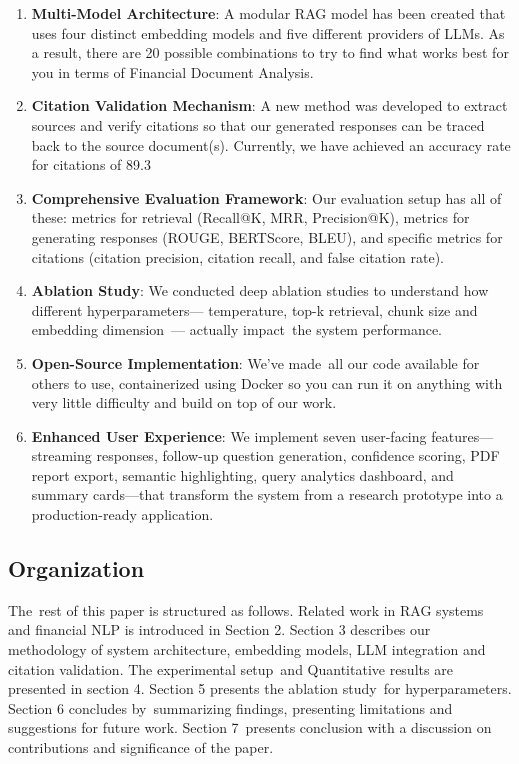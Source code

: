 \documentclass[runningheads]{llncs}
\begin{document}
\begin{enumerate}
    \item \textbf{Multi-Model Architecture}: A modular RAG model has been created that uses four distinct embedding models and five different providers of LLMs. As a result, there are 20 possible combinations to try to find what works best for you in terms of Financial Document Analysis.

    \item \textbf{Citation Validation Mechanism}: ﻿A new method was developed to extract sources and verify citations so that our generated responses can be traced back to the source document(s). Currently, we have achieved an accuracy rate for citations of 89.3%

    \item \textbf{Comprehensive Evaluation Framework}: 
    Our evaluation setup has all of these: metrics for retrieval (Recall@K, MRR, Precision@K), metrics for generating responses (ROUGE, BERTScore, BLEU), and specific metrics for citations (citation precision, citation recall, and false citation rate).

   \item \textbf{Ablation Study}: We conducted deep ablation studies to understand how different hyperparameters— temperature, top-k retrieval, chunk size and embedding dimension~— actually impact the system performance.

  \item \textbf{Open-Source Implementation}: We've made all our code available for others to use, containerized using Docker so you can run it on anything with very little difficulty and build on top of our work.

   \item \textbf{Enhanced User Experience}: We implement seven user-facing features---streaming responses, follow-up question generation, confidence scoring, PDF report export, semantic highlighting, query analytics dashboard, and summary cards---that transform the system from a research prototype into a production-ready application.
\end{enumerate}

\subsection{Organization}

The rest of this paper is structured as follows. Related work in RAG systems and financial NLP is introduced in Section 2. Section 3 describes our methodology of system architecture, embedding models, LLM integration and citation validation. The experimental setup and Quantitative results are presented in section 4. Section 5 presents the ablation study for hyperparameters. Section 6 concludes by summarizing findings, presenting limitations and suggestions for future work. Section 7 presents conclusion with a discussion on contributions and significance of the paper.
\end{document}
